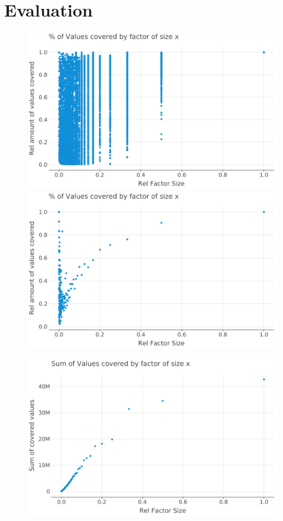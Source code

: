 
\chapter{Evaluation}
\label{ch:Evaluation}

\begin{figure}[h]
	\includegraphics[width=\linewidth]{plots/SHORTEST_PERIODS-all-relative-values-by-factor-size.png}
	\includegraphics[width=\linewidth]{plots/SHORTEST_PERIODS-all-relative-values-by-factor-size-average.png}
\end{figure}
\begin{figure}
	\includegraphics[width=\linewidth]{plots/GREEDY_SHORT_FACTORS-all-values-by-factor-size.png}
\end{figure}



